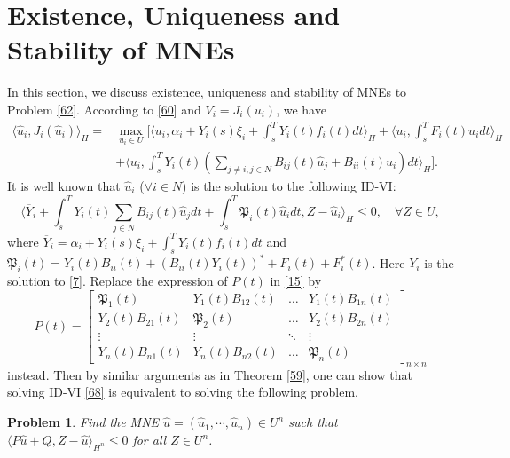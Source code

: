 \documentclass[10pt]{article}
\newtheorem{prob}{Problem}[section]
\begin{document}
\section{Existence, Uniqueness and Stability of  MNEs}
In this section, we discuss  existence, uniqueness and stability of MNEs to Problem \ref{62}. According to \eqref{60} and $V_i=J_i(u_i)$, we have
\begin{align*}
\langle \widehat{u}_i,J_i(\widehat{u}_i)\rangle_H=& \max_{u_i\in U}[\langle u_i,\alpha_i+Y_i(s)\xi_i+\int_s^TY_i(t)f_i(t)dt\rangle_H+ \langle u_i,\int_s^TF_i(t)u_i dt\rangle_H\\
  & +\langle u_i,\int_s^TY_i(t)(\sum_{j\neq i,j\in N}B_{ij}(t)\widehat{u}_j+B_{ii}(t)u_i)dt\rangle_H].
\end{align*}
It is well known that $\widehat{u}_i$ ($\forall i\in N$) is the solution to the following ID-VI:
\begin{equation}\label{68}
\langle \overline{Y}_{i}+\int_s^TY_i(t)\sum_{j\in N}B_{ij}(t)\widehat{u}_jdt
+\int_s^T\mathfrak{P}_{i}(t)\widehat{u}_i dt,Z-\widehat{u}_i\rangle_H\leq0,\quad \forall Z\in U,
\end{equation}
where $\overline{Y}_{i}=\alpha_i+Y_{i}(s)\xi_{i}+\int_s^TY_{i}(t)f_{i}(t)dt$ and $\mathfrak{P}_{i}(t)=Y_i(t)B_{ii}(t)+(B_{ii}(t)Y_i(t))^*+F_i(t)+F^*_i(t)$. Here $Y_i$ is the solution to \eqref{7}. Replace the expression of $P(t)$ in \eqref{15} by
$$
P(t)=\begin{bmatrix}
\mathfrak{P}_1(t) & Y_1(t)B_{12}(t)&\dots & Y_1(t)B_{1n}(t)\\
  Y_2(t)B_{21}(t)& \mathfrak{P}_2(t)&\dots & Y_2(t)B_{2n}(t)\\
\vdots &\vdots & \ddots&\vdots\\
Y_n(t)B_{n1}(t)&Y_n(t)B_{n2}(t)&\dots & \mathfrak{P}_n(t)
\end{bmatrix}_{n \times n}
$$
instead. Then by similar arguments as  in Theorem \ref{59}, one can show that solving ID-VI \eqref{68}   is equivalent to solving the following problem.
\begin{prob}\label{69}
Find the MNE $\widehat{u}=(\widehat{u}_1,\cdots,\widehat{u}_n)\in U^n$ such that
$\langle P\widehat{u}+Q,Z-\widehat{u}\rangle_{H^n}\leq 0$ for all $Z\in U^{n}$.
\end{prob}
\end{document}
